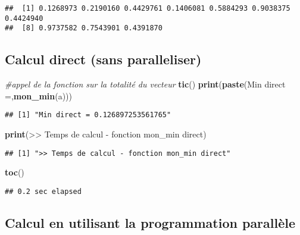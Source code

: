 \documentclass[
]{article}
\newenvironment{Shaded}{\begin{snugshade}}{\end{snugshade}}
\newcommand{\CommentTok}[1]{\textcolor[rgb]{0.56,0.35,0.01}{\textit{#1}}}
\newcommand{\FunctionTok}[1]{\textcolor[rgb]{0.13,0.29,0.53}{\textbf{#1}}}
\newcommand{\NormalTok}[1]{#1}
\newcommand{\StringTok}[1]{\textcolor[rgb]{0.31,0.60,0.02}{#1}}
\begin{document}
\begin{verbatim}
##  [1] 0.1268973 0.2190160 0.4429761 0.1406081 0.5884293 0.9038375 0.4424940
##  [8] 0.9737582 0.7543901 0.4391870
\end{verbatim}

\hypertarget{calcul-direct-sans-paralleliser}{%
\subsection{Calcul direct (sans
paralleliser)}\label{calcul-direct-sans-paralleliser}}

\begin{Shaded}
\begin{Highlighting}[]
\CommentTok{\#appel de la fonction sur la totalité du vecteur}
\FunctionTok{tic}\NormalTok{()}
\FunctionTok{print}\NormalTok{(}\FunctionTok{paste}\NormalTok{(}\StringTok{\textquotesingle{}Min direct =\textquotesingle{}}\NormalTok{,}\FunctionTok{mon\_min}\NormalTok{(a)))}
\end{Highlighting}
\end{Shaded}

\begin{verbatim}
## [1] "Min direct = 0.126897253561765"
\end{verbatim}

\begin{Shaded}
\begin{Highlighting}[]
\FunctionTok{print}\NormalTok{(}\StringTok{\textquotesingle{}\textgreater{}\textgreater{} Temps de calcul {-} fonction mon\_min direct\textquotesingle{}}\NormalTok{)}
\end{Highlighting}
\end{Shaded}

\begin{verbatim}
## [1] ">> Temps de calcul - fonction mon_min direct"
\end{verbatim}

\begin{Shaded}
\begin{Highlighting}[]
\FunctionTok{toc}\NormalTok{()}
\end{Highlighting}
\end{Shaded}

\begin{verbatim}
## 0.2 sec elapsed
\end{verbatim}

\hypertarget{calcul-en-utilisant-la-programmation-paralluxe8le}{%
\subsection{Calcul en utilisant la programmation
parallèle}\label{calcul-en-utilisant-la-programmation-paralluxe8le}}
\end{document}
